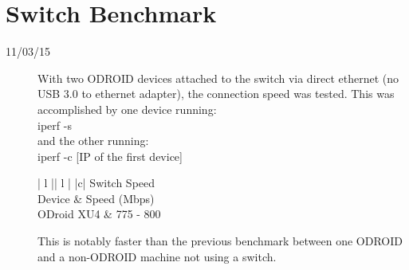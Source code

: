 \section{Switch Benchmark}
\begin{description}
\item [11/03/15] With two ODROID devices attached to the switch via direct ethernet (no USB 3.0 to ethernet adapter), the connection speed was tested. This was accomplished by one device running: \\

iperf -s \\

and the other running: \\

iperf -c [IP of the first device]

\begin{center}
\begin{tabular}{ | l || l | }
\hline
{}
{ |c| }{ Switch Speed } \\
\hline
Device & Speed (Mbps) \\
\hline
ODroid XU4 & 775 - 800 \\
\hline
\end{tabular}
\end{center}

This is notably faster than the previous benchmark between one ODROID and a non-ODROID machine not using a switch.
\end{description}

